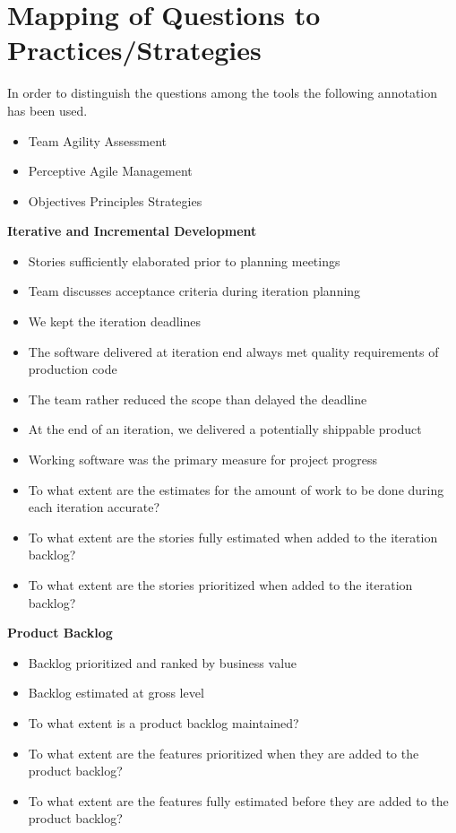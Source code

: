 \chapter{Mapping of Questions to Practices/Strategies}
\label{ch:mapping}

\newcommand*\taa{\item[\FiveStar]}
\newcommand*\taar{\item[\FiveStarShadow]}
\newcommand*\taanr{\item[\SnowflakeChevron]}
\newcommand*\pam{\item[\AsteriskBold]}
\newcommand*\pamr{\item[\AsteriskThinCenterOpen]}
\newcommand*\ops{\item[\FiveStarOutlineHeavy]}

In order to distinguish the questions among the tools the following annotation has been used. 
\begin{itemize}
  \taa Team Agility Assessment%
  \pam Perceptive Agile Management%
  \ops Objectives Principles Strategies
\end{itemize}

\vspace{0.5cm}

\textbf{Iterative and Incremental Development}
\begin{itemize}
	\taa Stories sufficiently elaborated prior to planning meetings
	\taa Team discusses acceptance criteria during iteration planning %
	\pam We kept the iteration deadlines %
	\pam The software delivered at iteration end always met quality requirements of production code %
	\pam The team rather reduced the scope than delayed the deadline %
	\pam At the end of an iteration, we delivered a potentially shippable product %
	\pam Working software was the primary measure for project progress %
	\ops To what extent are the estimates for the amount of work to be done during each iteration accurate?
	\ops To what extent are the stories fully estimated when added to the iteration backlog?
	\ops To what extent are the stories prioritized when added to the iteration backlog?	
\end{itemize}

\textbf{Product Backlog}
\begin{itemize}
	\taa Backlog prioritized and ranked by business value
	\taa Backlog estimated at gross level %
	\ops To what extent is a product backlog maintained?
	\ops To what extent are the features prioritized when they are added to the product backlog?
	\ops To what extent are the features fully estimated before they are added to the product backlog?
\end{itemize}

